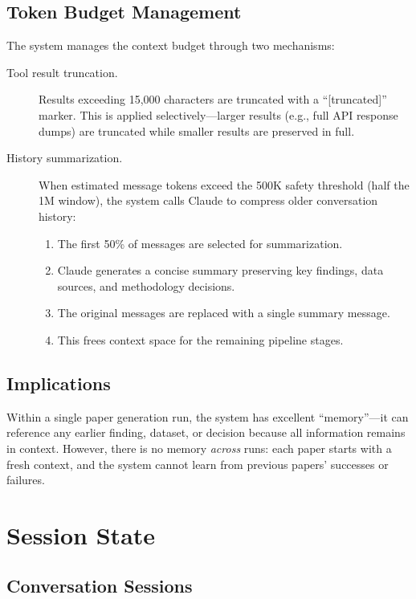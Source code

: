 \subsection{Token Budget Management}

The system manages the context budget through two mechanisms:

\begin{description}
  \item[Tool result truncation.] Results exceeding 15,000 characters are truncated with a ``[truncated]'' marker. This is applied selectively---larger results (e.g., full API response dumps) are truncated while smaller results are preserved in full.

  \item[History summarization.] When estimated message tokens exceed the 500K safety threshold (half the 1M window), the system calls Claude to compress older conversation history:
  \begin{enumerate}
    \item The first 50\% of messages are selected for summarization.
    \item Claude generates a concise summary preserving key findings, data sources, and methodology decisions.
    \item The original messages are replaced with a single summary message.
    \item This frees context space for the remaining pipeline stages.
  \end{enumerate}
\end{description}

\subsection{Implications}

Within a single paper generation run, the system has excellent ``memory''---it can reference any earlier finding, dataset, or decision because all information remains in context.
However, there is no memory \emph{across} runs: each paper starts with a fresh context, and the system cannot learn from previous papers' successes or failures.

\section{Session State}
\label{sec:memory:session}

\subsection{Conversation Sessions}

